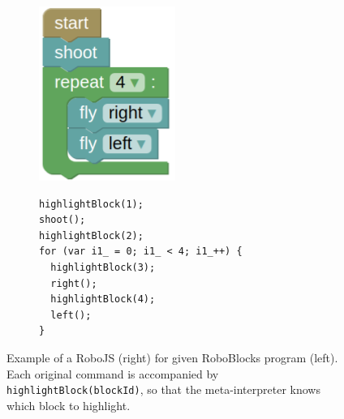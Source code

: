 

\begin{figure}[h]
\begin{subfigure}{.28\textwidth}
\centering\includegraphics[width=.8\textwidth]{img/roboblocks-english}
\end{subfigure}
\begin{subfigure}{.7\textwidth}
{\lstset{numbers=none}
\begin{lstlisting}
highlightBlock(1);
shoot();
highlightBlock(2);
for (var i1_ = 0; i1_ < 4; i1_++) {
  highlightBlock(3);
  right();
  highlightBlock(4);
  left();
}
\end{lstlisting}}
\end{subfigure}
\caption{%
  Example of a RoboJS (right) for given RoboBlocks program (left). %
  Each original command is accompanied by \texttt{highlightBlock(blockId)},
  so that the meta-interpreter knows which block to highlight.}
\label{fig:robojs-example}
\end{figure}

